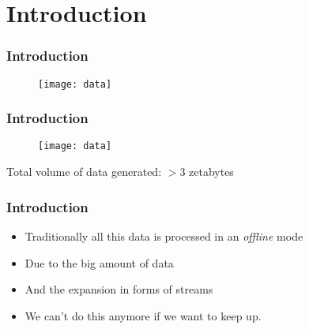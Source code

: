 \section{Introduction}


\begin{frame}
\frametitle{Introduction}

\begin{figure}
\centering
\texttt{[image: data]}
\end{figure}

\end{frame}


\begin{frame}
\frametitle{Introduction}

\begin{figure}
\centering
\texttt{[image: data]}
\end{figure}

\LARGE Total volume of data generated: $>3$ zetabytes

\end{frame}



\begin{frame}
\frametitle{Introduction}
\begin{itemize}
\item<1-4> Traditionally all this data is processed in an \textit{offline} mode
\item<2-4> Due to the big amount of data
\item<2-4> And the expansion in forms of streams
\item<3-4> We can't do this anymore if we want to keep up.


\end{itemize}


\end{frame}
